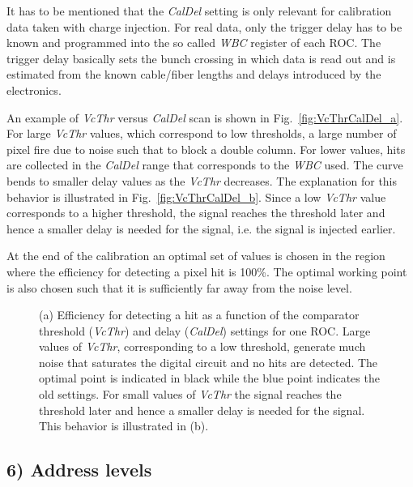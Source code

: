 It has to be mentioned that the \textit{CalDel} setting is only relevant for calibration data taken with charge injection.
For real data, only the trigger delay has to be known and programmed into the so called \textit{WBC} register of each ROC.
The trigger delay basically sets the bunch crossing in which data is read out and is estimated from the known cable/fiber lengths and delays introduced by the electronics.

An example of \textit{VcThr} versus \textit{CalDel} scan is shown in Fig.~\ref{fig:VcThrCalDel_a}.
For large \textit{VcThr} values, which correspond to low thresholds, a large number of pixel fire due to noise such that to block a double column.
For lower values, hits are collected in the \textit{CalDel} range that corresponds to the \textit{WBC} used.
The curve bends to smaller delay values as the \textit{VcThr} decreases. The explanation for this behavior is illustrated in Fig.~\ref{fig:VcThrCalDel_b}.
Since a low \textit{VcThr} value corresponds to a higher threshold, the signal reaches the threshold later and hence a smaller delay is needed for the signal, i.e. the signal is injected earlier.

At the end of the calibration an optimal set of values is chosen in the region where the efficiency for detecting a pixel hit is 100\%.
The optimal working point is also chosen such that it is sufficiently far away from the noise level.

\begin{figure}[!htb]
 \begin{center}
 \end{center}
 \caption{(a) Efficiency for detecting a hit as a function of the comparator threshold (\textit{VcThr}) and delay (\textit{CalDel}) settings for one ROC. Large values of \textit{VcThr}, corresponding to a low threshold, generate much noise that saturates the digital circuit and no hits are detected. The optimal point is indicated in black while the blue point indicates the old settings. For small values of \textit{VcThr} the signal reaches the threshold later and hence a smaller delay is needed for the signal. This behavior is illustrated in (b).}
 \label{fig:VcThrCalDel}
\end{figure}

\subsection*{6) Address levels}


